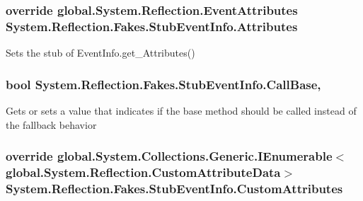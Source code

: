 \hypertarget{class_system_1_1_reflection_1_1_fakes_1_1_stub_event_info_a575ee139fda4b64da3c862647142b746}{
\subsubsection[{Attributes}]{\setlength{\rightskip}{0pt plus 5cm}override global.\-System.\-Reflection.\-Event\-Attributes System.\-Reflection.\-Fakes.\-Stub\-Event\-Info.\-Attributes\hspace{0.3cm}{\ttfamily [get]}}}\label{class_system_1_1_reflection_1_1_fakes_1_1_stub_event_info_a575ee139fda4b64da3c862647142b746}


Sets the stub of Event\-Info.\-get\-\_\-\-Attributes()

\hypertarget{class_system_1_1_reflection_1_1_fakes_1_1_stub_event_info_a7b692c013c69979647f44ed8f0bac0e2}{
\subsubsection[{Call\-Base}]{\setlength{\rightskip}{0pt plus 5cm}bool System.\-Reflection.\-Fakes.\-Stub\-Event\-Info.\-Call\-Base\hspace{0.3cm}{\ttfamily [get]}, {\ttfamily [set]}}}\label{class_system_1_1_reflection_1_1_fakes_1_1_stub_event_info_a7b692c013c69979647f44ed8f0bac0e2}


Gets or sets a value that indicates if the base method should be called instead of the fallback behavior

\hypertarget{class_system_1_1_reflection_1_1_fakes_1_1_stub_event_info_aa830c0f2ef29c6a3d0021b3e48be709c}{
\subsubsection[{Custom\-Attributes}]{\setlength{\rightskip}{0pt plus 5cm}override global.\-System.\-Collections.\-Generic.\-I\-Enumerable$<$global.\-System.\-Reflection.\-Custom\-Attribute\-Data$>$ System.\-Reflection.\-Fakes.\-Stub\-Event\-Info.\-Custom\-Attributes\hspace{0.3cm}{\ttfamily [get]}}}\label{class_system_1_1_reflection_1_1_fakes_1_1_stub_event_info_aa830c0f2ef29c6a3d0021b3e48be709c}



